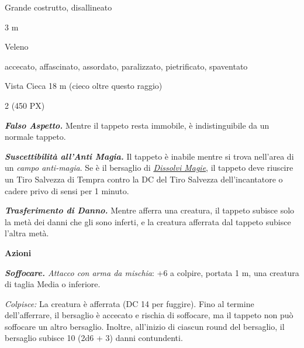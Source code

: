 \begin{multicols}{2}
{
\begin{description}[noitemsep, topsep=0pt, parsep=0pt, partopsep=0pt, itemsep=1pt, leftmargin=2.35cm,  labelwidth=2.2cm, itemindent=0cm, listparindent=0pt] %
\setlength{\baselineskip}{10pt}
\item[\textbf{Taglia/Tipo}] Grande costrutto, disallineato
\item[\textbf{Caratt.}] 
\item[\textbf{Punti Ferita}] 
\item[\textbf{Movimento}] 3 m
\item[\textbf{Tiri Salvez.}] 
\item[\textbf{Imm. Danni}] Veleno
\item[\textbf{Immunità}] accecato, affascinato, assordato, paralizzato, pietrificato, spaventato
\item[\textbf{Sensi}] Vista Cieca 18 m (cieco oltre questo raggio)
\item[\textbf{Sfida}] 2 (450 PX)
\end{description}
\smallskip

\emph{\textbf{Falso Aspetto.}} Mentre il tappeto resta immobile, è indistinguibile da un normale tappeto.

\emph{\textbf{Suscettibilità all'Anti Magia.}} Il tappeto è inabile mentre si trova nell'area di un \emph{campo anti-magia}. Se è il bersaglio di \emph{\hyperlink{Dissolvi Magie}{Dissolvi Magie}}, il tappeto deve riuscire un Tiro Salvezza di Tempra contro la DC del Tiro Salvezza dell'incantatore o cadere privo di sensi per 1 minuto.

\emph{\textbf{Trasferimento di Danno.}} Mentre afferra una creatura, il tappeto subisce solo la metà dei danni che gli sono inferti, e la creatura afferrata dal tappeto subisce l'altra metà.

\textbf{Azioni}

\emph{\textbf{Soffocare.} Attacco con arma da mischia}: +6 a colpire, portata 1 m, una creatura di taglia Media o inferiore.

\emph{Colpisce:} La creatura è afferrata (DC 14 per fuggire). Fino al termine dell'afferrare, il bersaglio è accecato e rischia di soffocare, ma il tappeto non può soffocare un altro bersaglio. Inoltre, all'inizio di ciascun round del bersaglio, il bersaglio subisce 10 (2d6 + 3) danni contundenti.

}
\end{multicols}
